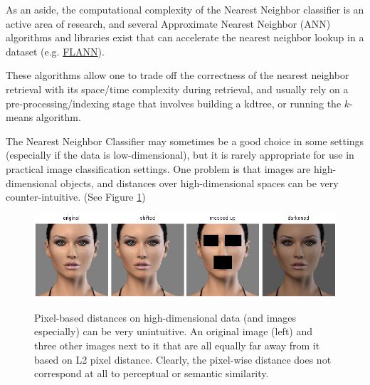 As an aside, the computational complexity of the Nearest Neighbor classifier is an active area of research, and several Approximate Nearest Neighbor (ANN) algorithms and libraries exist that can accelerate the nearest neighbor lookup in a dataset (e.g. \href{http://www.cs.ubc.ca/research/flann/}{FLANN}).

These algorithms allow one to trade off the correctness of the nearest neighbor retrieval with its space/time complexity during retrieval, and usually rely on a pre-processing/indexing stage that involves building a kdtree, or running the $k$-means algorithm.

The Nearest Neighbor Classifier may sometimes be a good choice in some settings (especially if the data is low-dimensional), but it is rarely appropriate for use in practical image classification settings. 
One problem is that images are high-dimensional objects, and distances over high-dimensional spaces can be very counter-intuitive. (See Figure \ref{samenorm})
\begin{figure}
  \centering
  \includegraphics[width=5 in]{pic/samenorm}\\
  \caption{Pixel-based distances on high-dimensional data (and images especially) can be very unintuitive. An original image (left) and three other images next to it that are all equally far away from it based on L2 pixel distance. Clearly, the pixel-wise distance does not correspond at all to perceptual or semantic similarity.}\label{samenorm}
\end{figure}

